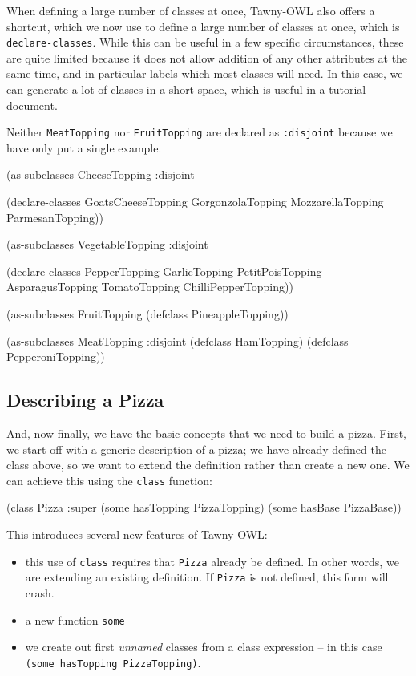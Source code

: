 \documentclass[11pt]{article}
\begin{document}
When defining a large number of classes at once, Tawny-OWL also offers a
shortcut, which we now use to define a large number of classes at once, which
is \verb~declare-classes~. While this can be useful in a few specific
circumstances, these are quite limited because it does not allow addition of
any other attributes at the same time, and in particular labels which most
classes will need. In this case, we can generate a lot of classes in a short
space, which is useful in a tutorial document.

Neither \verb~MeatTopping~ nor \verb~FruitTopping~ are declared as \verb~:disjoint~ because
we have only put a single example.

\begin{tawny}
(as-subclasses
 CheeseTopping
 :disjoint

 (declare-classes
  GoatsCheeseTopping
  GorgonzolaTopping
  MozzarellaTopping
  ParmesanTopping))

(as-subclasses
 VegetableTopping
 :disjoint

 (declare-classes
  PepperTopping
  GarlicTopping
  PetitPoisTopping
  AsparagusTopping
  TomatoTopping
  ChilliPepperTopping))

(as-subclasses
 FruitTopping
 (defclass PineappleTopping))

(as-subclasses
 MeatTopping
 :disjoint
 (defclass HamTopping)
 (defclass PepperoniTopping))
\end{tawny}

\subsection{Describing a Pizza}
\label{sec-5-5}

And, now finally, we have the basic concepts that we need to build a pizza.
First, we start off with a generic description of a pizza; we have already
defined the class above, so we want to extend the definition rather than
create a new one. We can achieve this using the \verb~class~ function:

\begin{tawny}
(class Pizza
   :super
   (some hasTopping PizzaTopping)
   (some hasBase PizzaBase))
\end{tawny}

This introduces several new features of Tawny-OWL:
\begin{itemize}
\item this use of \verb~class~ requires that \verb~Pizza~ already be defined. In other
words, we are extending an existing definition. If \verb~Pizza~ is not defined,
this form will crash.
\item a new function \verb~some~
\item we create out first \emph{unnamed} classes from a class expression -- in this
case \verb~(some hasTopping PizzaTopping)~.
\end{itemize}
\end{document}

